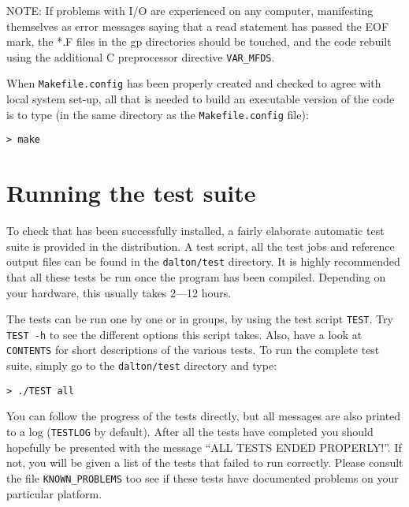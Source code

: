 NOTE: If problems with I/O are experienced on
any computer,
manifesting themselves as error messages saying that a read statement
has passed the EOF mark, the *.F files in the gp directories should be
touched, and the code rebuilt using the additional C preprocessor
directive \verb|VAR_MFDS|.

When  \verb|Makefile.config| has been properly
created and checked
to agree with local system set-up, all that is needed
to build an executable version of the
code is to type
(in the same directory as the \verb|Makefile.config| file):
\begin{verbatim}
> make
\end{verbatim}
%

\section{Running the {\dalton} test suite}\label{sec:testsuite}

To check that {\dalton} has been successfully installed, a fairly
elaborate automatic test suite is provided in the distribution. A test
script, all the test jobs and reference output files can be found in
the \verb|dalton/test| directory. It is highly recommended that all
these tests be run once the program has been compiled. Depending on
your hardware, this usually takes 2---12 hours.

The tests can be run one by one or in groups, by using the test script
\verb|TEST|. Try \verb|TEST -h| to see the different options this
script takes. Also, have a look at \verb|CONTENTS|
for short descriptions of the various tests. To run the
complete test suite, simply go to the \verb|dalton/test| directory and
type:
\begin{verbatim}
> ./TEST all
\end{verbatim}
You can follow the progress of the tests directly, but all messages
are also printed to a log (\verb|TESTLOG| by default). After all the
tests have completed you should hopefully be presented with the
message ``ALL TESTS ENDED PROPERLY!''. If not, you will be given a
list of the tests that failed to run correctly. Please consult the file
\verb|KNOWN_PROBLEMS| too see if these tests have documented problems
on your particular platform.

